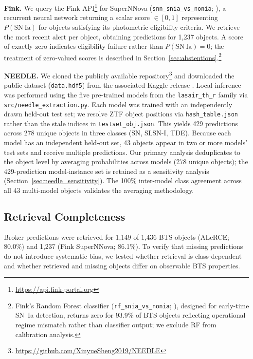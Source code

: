 \documentclass[twocolumn]{aastex631}
\begin{document}
\textbf{Fink.} We query the Fink
API\footnote{\url{https://api.fink-portal.org}} for SuperNNova
(\texttt{snn\_snia\_vs\_nonia}; \citealt{moller2020}), a recurrent
neural network returning a scalar score $\in [0,1]$ representing
$P(\mathrm{SN~Ia})$ for objects satisfying its photometric
eligibility criteria. We retrieve the most recent alert per object,
obtaining predictions for 1,237 objects. A score of exactly zero
indicates eligibility failure rather than $P(\mathrm{SN~Ia}) = 0$;
the treatment of zero-valued scores is described in
Section~\ref{sec:abstentions}.\footnote{Fink's Random Forest
classifier (\texttt{rf\_snia\_vs\_nonia}; \citealt{leoni2022}),
designed for early-time SN~Ia detection, returns zero for 93.9\%
of BTS objects reflecting operational regime mismatch rather than
classifier output; we exclude RF from calibration analysis.}

\textbf{NEEDLE.} We cloned the publicly available
repository\footnote{\url{https://github.com/XinyueSheng2019/NEEDLE}}
and downloaded the public dataset (\texttt{data.hdf5}) from the
associated Kaggle release \citep{sheng2024}. Local inference was
performed using the five pre-trained models from the
\texttt{lasair\_th\_r} family via \texttt{src/needle\_extraction.py}.
Each model was trained with an independently drawn held-out test
set; we resolve ZTF object positions via \texttt{hash\_table.json}
rather than the stale indices in \texttt{testset\_obj.json}. This
yields 429 predictions across 278 unique objects in three classes
(SN, SLSN-I, TDE). Because each model has an independent held-out
set, 43 objects appear in two or more models' test sets and receive
multiple predictions. Our primary analysis deduplicates to the
object level by averaging probabilities across models (278 unique
objects); the 429-prediction model-instance set is retained as a
sensitivity analysis (Section~\ref{sec:needle_sensitivity}). The
100\% inter-model class agreement across all 43 multi-model objects
validates the averaging methodology.

\subsection{Retrieval Completeness}\label{sec:retrieval}

Broker predictions were retrieved for 1,149 of 1,436 BTS objects
(ALeRCE; 80.0\%) and 1,237 (Fink SuperNNova; 86.1\%). To verify
that missing predictions do not introduce systematic bias, we
tested whether retrieval is class-dependent and whether retrieved
and missing objects differ on observable BTS properties.
\end{document}
